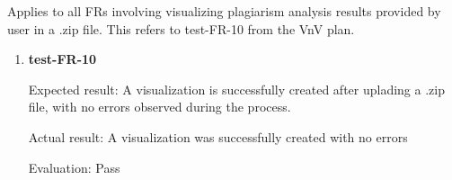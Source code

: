 \documentclass[12pt, titlepage]{article}
\begin{document}
Applies to all FRs involving visualizing plagiarism analysis results provided 
by user in a .zip file. This refers to test-FR-10 from the VnV plan.


\begin{enumerate}

\item{\textbf{test-FR-10}}
			
Expected result: A visualization is successfully created after uplading a .zip
file, with no errors observed during the process.

Actual result: A visualization was successfully created with no errors

Evaluation: Pass

\end{enumerate}
\end{document}
